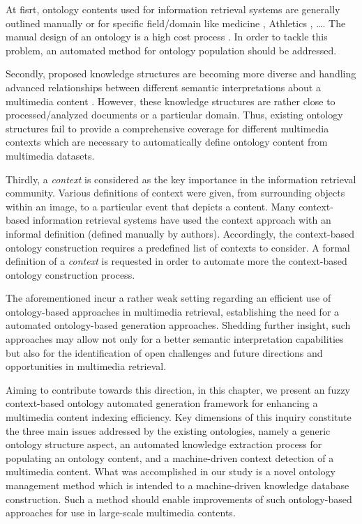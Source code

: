 At fisrt, ontology contents used for information retrieval systems are generally outlined  manually or for specific field/domain 
like medicine \cite{Rozilawatibinti2011}, Athletics \cite{Paliouras2011}, \dots. The manual design of an ontology is a high cost process \cite{Song2009}. In order to tackle this problem, an automated method for ontology population should be addressed.

Secondly, proposed knowledge structures are becoming more diverse and handling advanced relationships between different semantic interpretations about a multimedia content \cite{Mylonas2008,Fellbaum2010, Bannour2013, Elleuch2011}. However, these knowledge structures are rather close to processed/analyzed documents or a particular domain. Thus, existing ontology structures fail to provide a comprehensive coverage for different multimedia contexts which are necessary to automatically define ontology content from multimedia datasets.

Thirdly, a \emph{context} is considered as the key importance in the information retrieval community. Various definitions of context were given, from surrounding objects within an image, to a particular event that depicts a content. Many context-based information retrieval systems have used the context approach with an informal definition \cite{Mylonas2009,Nguyen2010,Elleuch2011,PerpetualCoutinho2012} (defined manually by authors). Accordingly, the context-based ontology construction requires a predefined list of contexts to consider. A  formal definition of a \emph{context} is requested in order to automate more the context-based ontology construction process.

The aforementioned incur a rather weak setting regarding an efficient use of ontology-based approaches in multimedia retrieval, establishing the need for a automated ontology-based generation approaches. Shedding further insight, such approaches may allow not only for a better semantic interpretation capabilities but also for the identification of open challenges and future directions and opportunities in multimedia retrieval.
		
Aiming to contribute towards this direction, in this chapter, we present an fuzzy context-based ontology automated generation framework for enhancing a multimedia content indexing efficiency. Key dimensions of this inquiry constitute the three main issues addressed by the existing ontologies, namely a generic ontology structure aspect, an automated knowledge extraction process for populating an ontology content, and a machine-driven context detection of a multimedia content. What was accomplished in our study is a novel ontology management method which is intended to a machine-driven knowledge database construction. Such a method should enable improvements of such ontology-based approaches for use in large-scale multimedia contents.



